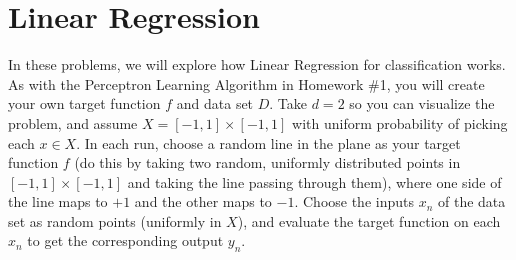 \documentclass[answers]{exam}
\begin{document}
\section*{Linear Regression}

In these problems, we will explore how Linear Regression for classification works. 
As with the Perceptron Learning Algorithm in Homework \#1, you will create your 
own target function $f$ and data set $D$. Take $d = 2$ so you can visualize the 
problem, and assume $X = [-1, 1] \times [-1, 1]$ with uniform probability of 
picking each $x \in X$. In each run, choose a random line in the plane as your 
target function $f$ (do this by taking two random, uniformly distributed points in 
$[-1, 1] \times [-1, 1]$ and taking the line passing through them), where one side 
of the line maps to $+1$ and the other maps to $-1$. Choose the inputs $x_n$ of 
the data set as random points (uniformly in $X$), and evaluate the target function 
on each $x_n$ to get the corresponding output $y_n$.
\end{document}
